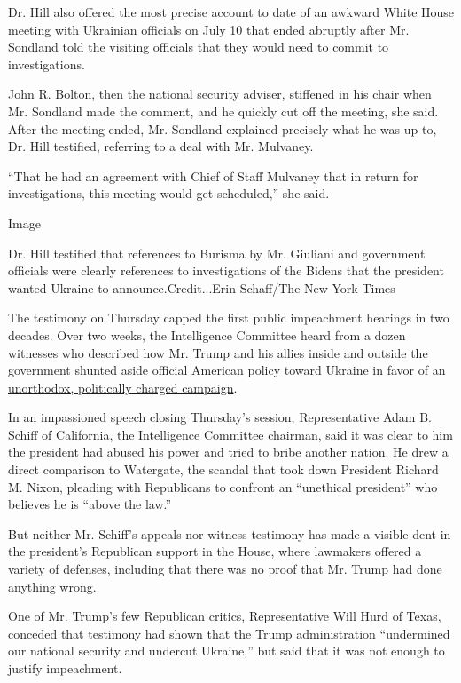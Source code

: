 Dr. Hill also offered the most precise account to date of an awkward
White House meeting with Ukrainian officials on July 10 that ended
abruptly after Mr. Sondland told the visiting officials that they would
need to commit to investigations.

John R. Bolton, then the national security adviser, stiffened in his
chair when Mr. Sondland made the comment, and he quickly cut off the
meeting, she said. After the meeting ended, Mr. Sondland explained
precisely what he was up to, Dr. Hill testified, referring to a deal
with Mr. Mulvaney.

``That he had an agreement with Chief of Staff Mulvaney that in return
for investigations, this meeting would get scheduled,'' she said.

Image

Dr. Hill testified that references to Burisma by Mr. Giuliani and
government officials were clearly references to investigations of the
Bidens that the president wanted Ukraine to announce.Credit...Erin
Schaff/The New York Times

The testimony on Thursday capped the first public impeachment hearings
in two decades. Over two weeks, the Intelligence Committee heard from a
dozen witnesses who described how Mr. Trump and his allies inside and
outside the government shunted aside official American policy toward
Ukraine in favor of an
\href{https://www.nytimes3xbfgragh.onion/interactive/2019/11/18/us/politics/trump-ukraine-impeachment-testimony.html}{unorthodox,
politically charged campaign}.

In an impassioned speech closing Thursday's session, Representative Adam
B. Schiff of California, the Intelligence Committee chairman, said it
was clear to him the president had abused his power and tried to bribe
another nation. He drew a direct comparison to Watergate, the scandal
that took down President Richard M. Nixon, pleading with Republicans to
confront an ``unethical president'' who believes he is ``above the
law.''

But neither Mr. Schiff's appeals nor witness testimony has made a
visible dent in the president's Republican support in the House, where
lawmakers offered a variety of defenses, including that there was no
proof that Mr. Trump had done anything wrong.

One of Mr. Trump's few Republican critics, Representative Will Hurd of
Texas, conceded that testimony had shown that the Trump administration
``undermined our national security and undercut Ukraine,'' but said that
it was not enough to justify impeachment.

